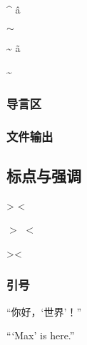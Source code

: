 \documentclass[twoside]{ctexart} %
\begin{document}
            \^{} \^a

            $\sim$
            
            \~{} \~a
            
            \textasciitilde

        \subsubsection{导言区}

        \subsubsection{文件输出}

    \subsection{标点与强调}
            > < 
            
            $>$ $<$ 
            
            \textgreater \textless 
        
            \subsubsection{引号}
            “你好，‘世界’！” 
            
            ``\thinspace`Max' is here.'' 
    
\end{document}
